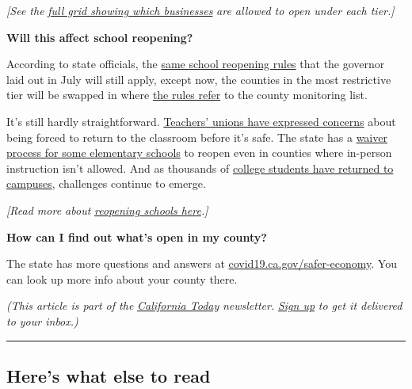 \emph{{[}See the}
\href{https://www.cdph.ca.gov/Programs/CID/DCDC/CDPH\%20Document\%20Library/COVID-19/Dimmer-Framework-August_2020.pdf}{\emph{full
grid showing which businesses}} \emph{are allowed to open under each
tier.{]}}

\textbf{Will this affect school reopening?}

According to state officials, the
\href{https://www.nytimes3xbfgragh.onion/2020/07/17/us/california-schools-reopening-newsom.html}{same
school reopening rules} that the governor laid out in July will still
apply, except now, the counties in the most restrictive tier will be
swapped in where
\href{https://www.cdph.ca.gov/Programs/CID/DCDC/CDPH\%20Document\%20Library/COVID-19/Schools\%20Reopening\%20Recommendations.pdf}{the
rules refer} to the county monitoring list.

It's still hardly straightforward.
\href{https://www.nytimes3xbfgragh.onion/2020/07/29/us/teacher-union-school-reopening-coronavirus.html}{Teachers'
unions have expressed concerns} about being forced to return to the
classroom before it's safe. The state has a
\href{https://edsource.org/2020/california-health-officials-list-conditions-for-an-elementary-school-waiver/637621}{waiver
process for some elementary schools} to reopen even in counties where
in-person instruction isn't allowed. And as thousands of
\href{https://www.nytimes3xbfgragh.onion/interactive/2020/us/covid-college-cases-tracker.html}{college
students have returned to campuses}, challenges continue to emerge.

\emph{{[}Read more about}
\href{https://www.nytimes3xbfgragh.onion/spotlight/schools-reopening?}{\emph{reopening
schools here}}\emph{.{]}}

\textbf{How can I find out what's open in my county?}

The state has more questions and answers at
\href{https://covid19.ca.gov/safer-economy/}{covid19.ca.gov/safer-economy}.
You can look up more info about your county there.

\emph{(This article is part of the}
\href{https://www.nytimes3xbfgragh.onion/column/california-today}{\emph{California
Today}} \emph{newsletter.}
\href{https://www.nytimes3xbfgragh.onion/newsletters/california-today}{\emph{Sign
up}} \emph{to get it delivered to your inbox.)}

\begin{center}\rule{0.5\linewidth}{\linethickness}\end{center}

\hypertarget{heres-what-else-to-read}{%
\subsection{Here's what else to read}\label{heres-what-else-to-read}}

